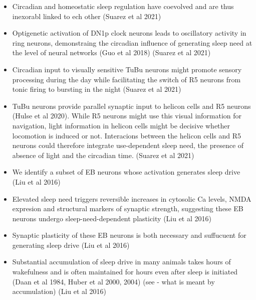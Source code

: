 \documentclass[11pt]{article}
\begin{document}
\begin{itemize}
    \item Circadian and homeostatic sleep regulation have coevolved and are thus inexorabl linked to ech other \parencite{suarez-grimaltNeuralArchitectureSleep2021}
    (Suarez et al 2021)

    \item Optigenetic activation of DN1p clock neurons leads to oscillatory activity in ring neurons,
    demonstraing the circadian influence of generating sleep need at the level of neural networks (Guo et al 2018) \parencite{suarez-grimaltNeuralArchitectureSleep2021}
    (Suarez et al 2021)

    \item Circadian input to visually sensitive TuBu neurons might promote sensory processing during the day while facilitating
    the switch of R5 neurons from tonic firing to bursting in the night \parencite{suarez-grimaltNeuralArchitectureSleep2021}
    (Suarez et al 2021)

    \item TuBu neurons provide parallel synaptic input to helicon cells and R5 neurons (Hulse et al 2020).
    While R5 neurons might use this visual information for navigation, light information in helicon cells might be
    decisive whether locomotion is induced or not. Interacions between the helicon cells and R5
    neurons could therefore integrate use-dependent sleep need, the presence of absence of light and the circadian time.
    \parencite{suarez-grimaltNeuralArchitectureSleep2021}
    (Suarez et al 2021)

    \item We identify a subset of EB neurons whose activation generates sleep drive \parencite{liuSleepDriveEncoded2016}
    (Liu et al 2016)
    
    \item Elevated sleep need triggers reversible increases in cytosolic Ca levels, NMDA expresion and structural markers
    of synaptic strength, suggesting these EB neurons undergo sleep-need-dependent plasticity \parencite{liuSleepDriveEncoded2016}
    (Liu et al 2016)

    \item Synaptic plasticity of these EB neurons is both necessary and suffucuent for generating sleep drive \parencite{liuSleepDriveEncoded2016}
    (Liu et al 2016)

    \item Substantial accumulation of sleep drive in many animals takes hours of wakefulness and is often
    maintained for hours even after sleep is initiated (Daan et al 1984, Huber et al 2000, 2004) \parencite{liuSleepDriveEncoded2016}
    (see - what is meant by accumulation)
    (Liu et al 2016)


\end{itemize}
\end{document}

